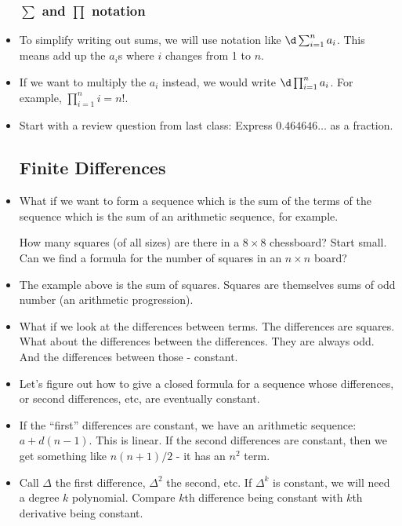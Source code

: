 \begin{itemize}
\subsubsection*{$\sum$ and $\prod$ notation}
\item To simplify writing out sums, we will use notation like $\d\sum_{i=1}^n a_i$.  This means add up the $a_i$s where $i$ changes from 1 to $n$.
\item If we want to multiply the $a_i$ instead, we would write $\d\prod_{i=1}^n a_i$.  For example, $\prod_{i=1}^n i = n!$.
\end{itemize}




\begin{itemize}
\item Start with a review question from last class: Express $0.464646\ldots$ as a fraction.


\subsection*{Finite Differences}
\item What if we want to form a sequence which is the sum of the terms of the sequence which is the sum of an arithmetic sequence, for example.

\ex How many squares (of all sizes) are there in a $8\times 8$ chessboard?  Start small.  Can we find a formula for the number of squares in an $n\times n$ board?

\item The example above is the sum of squares.  Squares are themselves sums of odd number (an arithmetic progression).

\item What if we look at the differences between terms.  The differences are squares.  What about the differences between the differences.  They are always odd.  And the differences between those - constant.

\item Let's figure out how to give a closed formula for a sequence whose differences, or second differences, etc, are eventually constant.

\item If the ``first'' differences are constant, we have an arithmetic sequence: $a + d(n-1)$.  This is linear.  If the second differences are constant, then we get something like $n(n+1)/2$ - it has an $n^2$ term. 

\item Call $\Delta$ the first difference, $\Delta^2$ the second, etc.  If $\Delta^k$ is constant, we will need a degree $k$ polynomial.  Compare $k$th difference being constant with $k$th derivative being constant.


\end{itemize}
